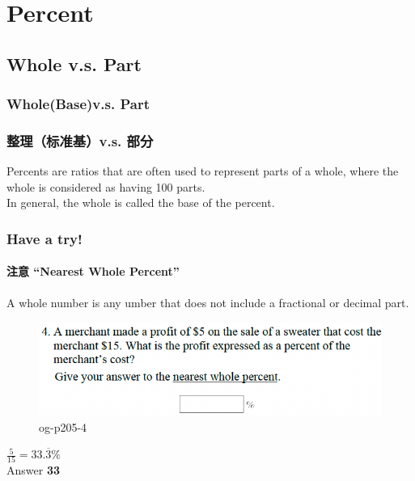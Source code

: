\documentclass[
	11pt, %
]{beamer}
\begin{document}

\section{Percent}

\subsection{Whole v.s. Part}

\begin{frame}
	\frametitle{Whole(Base)v.s. Part}
	\frametitle{整理（标准基）v.s. 部分}
	\begin{definition}
		Percents are ratios that are often used to represent parts of a \alert{whole}, where the whole is considered as having 100 \alert{parts}. \\
		In general, the whole is called the \alert{base} of the percent.
	\end{definition}
	
\end{frame}


\begin{frame}
	\frametitle{Have a try!}
	\framesubtitle{注意 “Nearest Whole Percent”}

	\begin{definition}
		A whole number is any umber that does not include a fractional or decimal part.
	\end{definition}

	\begin{figure}
		\includegraphics[width=\linewidth]{Percent_Example_Question_2.png}
		\caption{og-p205-4}
	\end{figure}
	\pause
$\frac{5}{15} = 33.\overline{3} \%$ \\

\pause
\bigskip
Answer \textbf{33}
\end{frame}

\end{document}
